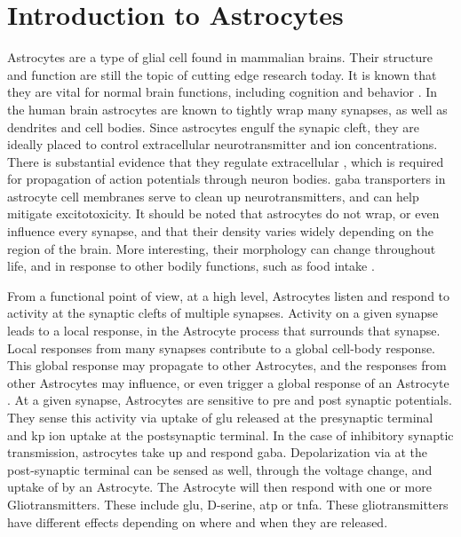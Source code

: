    \section{Introduction to Astrocytes}
    Astrocytes are a type of glial cell found in mammalian brains. Their
    structure and function are still the topic of cutting edge research
    today. It is known that they are vital for normal brain functions, including
    cognition and behavior \parencite{mederos_2018}. In the human brain astrocytes
    are known to tightly wrap many synapses, as well as dendrites and cell
    bodies. Since astrocytes engulf the synapic cleft, they are ideally
    placed to control extracellular neurotransmitter and ion
    concentrations. There is substantial evidence that they regulate
    extracellular \kp, which is required for propagation of action potentials
    through neuron bodies. \Gls{gaba} transporters in astrocyte cell membranes
    serve to clean up neurotransmitters, and can help mitigate excitotoxicity. It
    should be noted that astrocytes do not wrap, or even influence every
    synapse, and that their density varies widely depending on the region of the
    brain. More interesting, their morphology can change throughout life, and in
    response to other bodily functions, such as food intake \parencite{mederos_2018}.

    From a functional point of view, at a high level, Astrocytes listen and
    respond to activity at the synaptic clefts of multiple synapses. Activity on
    a given synapse leads to a local response, in the Astrocyte process that
    surrounds that synapse. Local responses from many synapses contribute to a
    global cell-body response. This global response may propagate to other
    Astrocytes, and the responses from other Astrocytes may influence, or even
    trigger a global response of an Astrocyte \parencite{min_2012}. At a given
    synapse, Astrocytes are sensitive to pre and post synaptic potentials. They
    sense this activity via uptake of \gls{glu} released at the presynaptic
    terminal and \gls{kp} ion uptake at the postsynaptic terminal. In the case
    of inhibitory synaptic transmission, astrocytes take up and respond
    \Gls{gaba}. Depolarization via \kp at the post-synaptic terminal can be
    sensed as well, through the voltage change, and uptake of \kp by an
    Astrocyte. The Astrocyte will then respond with one or more
    Gliotransmitters. These include \Gls{glu}, D-serine, \Gls{atp} or
    \Gls{tnfa}. These gliotransmitters have different effects depending on where
    and when they are released.

